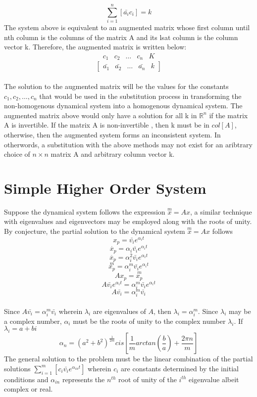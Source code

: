 $$\sum_{i = 1} ^ {n} \left[\bar{a_i}c_i\right] =  k$$
The system above is equivalent to an augmented matrix whose first column until nth column is the columns of the matrix A and its lsat column is the column vector k. Therefore, the augmented matrix is written below:
$$\begin{matrix}c_1 & c_2 & \dots & c_n& K \end{matrix}$$
$$\begin{bmatrix} \bar{a_1} & \bar{a_2} & \dots &\bar{a_n} &k \end{bmatrix}$$
\\The solution to the augmented matrix will be the values for the constants $c_1,c_2,\dots,c_n$ that would be used in the substitution process in transforming the non-homogenous dynamical system into a homogenous dynamical system. The augmented matrix above would only have a solution for all k in $\mathbb{R}^{n}$ if the matrix A is invertible. If the matrix A is non-invertible , then k must be in $col[A]$, otherwise, then the augmented system forms an inconsistent system. In otherwords, a substitution with the above methods may not exist for an aribtrary choice of $n\times n$ matrix A and arbitrary column vector k. 
\section{Simple Higher Order System}
\begin{comment}
\end{comment}
Suppose the dynamical system follows the expression $\displaystyle{\overset{m}{x} = Ax}$, a similar technique with eigenvalues and eigenvectors may be employed along with the roots of unity. By conjecture, the partial solution to the dynamical system $\displaystyle{\overset{m}{x} = Ax}$ follows
$$x_p = \bar{v_i}e^{\alpha_i t}$$
$$\dot{x_p} = \alpha_i\bar{v_i}e^{\alpha_i t}$$
$$\ddot{x_p} = \alpha_i^2\bar{v_i}e^{\alpha_i t}$$
$$\overset{m}{x_p} = \alpha_i^m\bar{v_i}e^{\alpha_i t}$$
$$Ax_p = \overset{m}{x_p}$$
$$A \bar{v_i}e^{\alpha_i t}= \alpha_i^m\bar{v_i}e^{\alpha_i t}$$
$$A \bar{v_i}= \alpha_i^m\bar{v_i}$$
\\Since $\displaystyle{A \bar{v_i}= \alpha_i^m\bar{v_i}}$ wherein $\displaystyle{\lambda_i}$ are eigenvalues of $A$, then $\lambda_i = \alpha_i^m$. Since $\lambda_i$ may be a complex number, $\alpha_i$ must be the roots of unity to the complex number $\lambda_i$. If $\lambda_i = a+bi$
$$\alpha_n = (a^2 + b^2)^{\frac{1}{2m}}cis\left[\frac{1}{m}arctan\left(\frac{b}{a}\right) + \frac{2 \pi n}{m}\right]$$
The general solution to the problem must be the linear combination of the partial solutions $\displaystyle{\sum_{i = 1}^m\left[c_i\bar{v_i}e^{\alpha_{in} t}\right]}$ wherein $c_i$ are constants determined by the initial conditions and $\alpha_{in}$ represents the $n^{th}$ root of unity of the $i^{th}$ eigenvalue albeit complex or real. 
